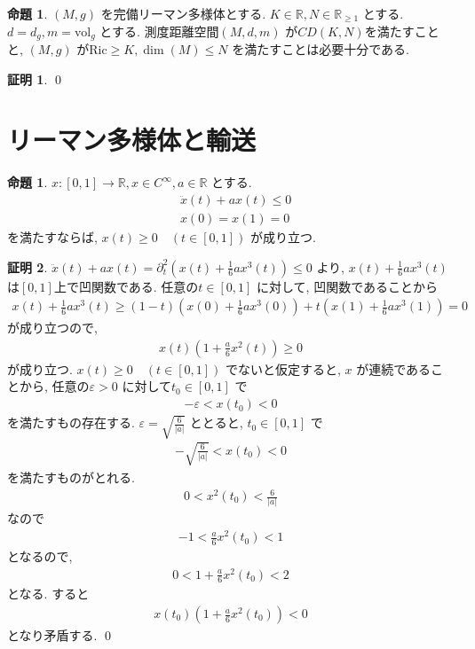 \documentclass[10pt, fleqn, label-section=none]{bxjsarticle}
\theoremstyle{definition}
\newtheorem{prop}[dfn]{命題}
\newtheorem*{pf*}{証明}
\newcommand{\veps}{\varepsilon}
\newcommand{\abs}[1]{\left|#1\right|}
\newcommand{\Ric}{\textrm{Ric}}
\newcommand{\vol}{\textrm{vol}}
\renewcommand{\;}{\, ; \,}
\begin{document}
\begin{prop}$(M, g)$ を完備リーマン多様体とする. $K \in \mathbb R, N \in \mathbb R_{\geq 1}$ とする. $d = d_g, m = \vol_g$ とする. 測度距離空間$(M ,d, m)$ が$CD(K,N)$を満たすことと, $(M, g)$ が$\Ric \geq K, \dim(M) \leq N$ を満たすことは必要十分である. 

\end{prop}
\begin{pf*}



\qed
\end{pf*}





\section{リーマン多様体と輸送}






\begin{prop}$x:[0,1] \rightarrow \mathbb R, x \in C^{\infty}, a \in \mathbb R$ とする. 
\begin{align*} & \ddot x (t) + a x(t) \leq 0 \\ & x(0) = x(1) = 0  \end{align*}
を満たすならば, $x(t) \geq 0  \quad (t \in [0,1])$ が成り立つ.  
\end{prop}
\begin{pf*}
$\ddot x (t) + a x(t) = \partial^2_t (x(t) + \frac{1}{6} a x^3(t)   ) \leq 0$ より, $x(t) + \frac{1}{6} a x^3(t) $ は$[0,1]$上で凹関数である. 任意の$t \in [0,1]$ に対して, 凹関数であることから
\begin{align*} x(t) + \frac{1}{6} a x^3(t) \geq (1-t)( x(0) + \frac{1}{6} a x^3(0)  ) + t (x(1) + \frac{1}{6} a x^3(1) ) = 0\end{align*}
が成り立つので, 
\begin{align*} x(t) (1 + \frac{a}{6} x^2 (t)  ) \geq 0   \end{align*}
が成り立つ. $x(t) \geq 0 \quad (t \in [0,1])$ でないと仮定すると, $x$ が連続であることから, 任意の$\veps > 0$ に対して$t_0 \in [0,1]$ で
\begin{align*} - \veps < x(t_0) < 0 \end{align*}
を満たすもの存在する. $\veps = \sqrt{\frac{6}{\abs a}} $ ととると, $t_0 \in [0,1]$ で
\begin{align*}  -\sqrt{\frac{6}{\abs a}} < x(t_0) < 0 \end{align*}
を満たすものがとれる. 
\begin{align*} 0 < x^2 (t_0) < \frac{6}{\abs a}  \end{align*}
なので
\begin{align*} -1 < \frac{a}{6} x^2(t_0) < 1 \end{align*}
となるので, 
\begin{align*} 0  < 1 + \frac{a}{6} x^2(t_0) < 2 \end{align*}
となる. すると
\begin{align*} x(t_0) (1 + \frac{a}{6} x^2(t_0) ) < 0 \end{align*}
となり矛盾する. 
\qed
\end{pf*}
\end{document}
